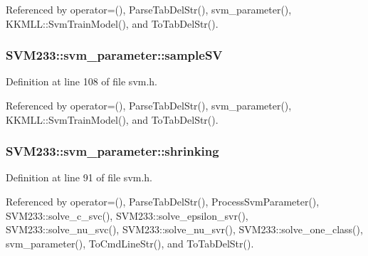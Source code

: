 Referenced by operator=(), Parse\+Tab\+Del\+Str(), svm\+\_\+parameter(), K\+K\+M\+L\+L\+::\+Svm\+Train\+Model(), and To\+Tab\+Del\+Str().

\subsubsection[{\texorpdfstring{sample\+SV}{sampleSV}}]{ S\+V\+M233\+::svm\+\_\+parameter\+::sample\+SV}\hypertarget{struct_s_v_m233_1_1svm__parameter_a962ae17b97aa2011984e49b4f96aba8b}{}\label{struct_s_v_m233_1_1svm__parameter_a962ae17b97aa2011984e49b4f96aba8b}


Definition at line 108 of file svm.\+h.



Referenced by operator=(), Parse\+Tab\+Del\+Str(), svm\+\_\+parameter(), K\+K\+M\+L\+L\+::\+Svm\+Train\+Model(), and To\+Tab\+Del\+Str().

\subsubsection[{\texorpdfstring{shrinking}{shrinking}}]{ S\+V\+M233\+::svm\+\_\+parameter\+::shrinking}\hypertarget{struct_s_v_m233_1_1svm__parameter_a383beec375da659e6a75ebebd95dfa9a}{}\label{struct_s_v_m233_1_1svm__parameter_a383beec375da659e6a75ebebd95dfa9a}


Definition at line 91 of file svm.\+h.



Referenced by operator=(), Parse\+Tab\+Del\+Str(), Process\+Svm\+Parameter(), S\+V\+M233\+::solve\+\_\+c\+\_\+svc(), S\+V\+M233\+::solve\+\_\+epsilon\+\_\+svr(), S\+V\+M233\+::solve\+\_\+nu\+\_\+svc(), S\+V\+M233\+::solve\+\_\+nu\+\_\+svr(), S\+V\+M233\+::solve\+\_\+one\+\_\+class(), svm\+\_\+parameter(), To\+Cmd\+Line\+Str(), and To\+Tab\+Del\+Str().

